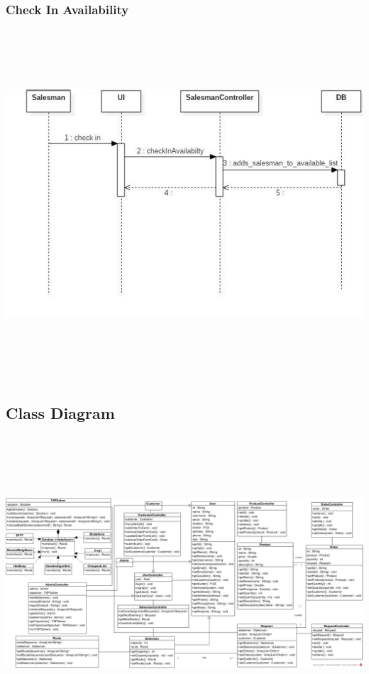 \documentclass[12pt]{article}
\begin{document}
\subsubsection{ Check In Availability }
\begin{center}
	\includegraphics[width=17cm,height=13cm]{./assets/sequencediagram/checkin.png}\\
\end{center}
\newpage

\subsection{ Class Diagram }

\begin{center}
    \includegraphics[width=17cm,height=11cm]{./assets/class-diagram.png}
\end{center}
\newpage
\end{document}
